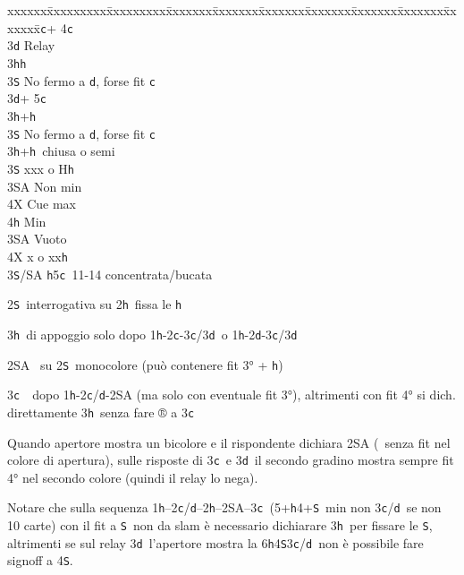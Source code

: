 \documentclass[a4paper,italian]{article}
\newcommand{\BS}{\small{\texttt{S}}}
\newcommand{\BC}{\small{\texttt{c}}}
\newcommand{\BD}{\small{\texttt{d}}}
\newcommand{\BH}{\small{\texttt{h}}}
\newenvironment{bidtable}
{\begin{tabbing}

    xxxxxx\=xxxxxxxxx\=xxxxxxxxx\=xxxxxxx\=xxxxxxx\=xxxxxxx\=xxxxxxx\=xxxxxxx\=xxxxxxx\=xxxxxxx\=\kill}
{\end{tabbing} }%
\newenvironment{varie}[1]
{\begin{tcolorbox}[colframe=green!40!black,title=#1]}
    {
\end{tcolorbox} }%
\begin{document}
\begin{multicols}{2}
\begin{bidtable}
        3\BC {}+ 4\BC \+\\
        3\BD \> Relay\\
        3\BH {}\BH \\
        3\BS \> No fermo a \BD , forse fit \BC \-\\
        3\BD {}+ 5\BC \+\\
        3\BH {}+\BH \\
        3\BS \> No fermo a \BD , forse fit \BC \-\\
        3\BH {}+\BH\ chiusa o semi\+\\
        3\BS \> xxx o H\BH \+\\
        3\small{SA} \> Non min\\
        4X \> Cue max\\
        4\BH \> Min\-\\
        3\small{SA} \> Vuoto\\
        4X \> x o xx\BH \-\\
        3\BS/\small{SA} \BH 5\BC\ 11-14 concentrata/bucata
    \end{bidtable}
\end{multicols}

\begin{varie}{Riepilogo mnemonico per i fissaggi}
    2\BS\ interrogativa su 2\BH\ fissa le \BH

    3\BH\ di appoggio solo dopo 1\BH-2\BC-3\BC/3\BD\ o 1\BH-2\BD-3\BC/3\BD

    2\small{SA} \textregistered\ su 2\BS\ monocolore  (può contenere fit 3° + \BH )

    3\BC\ \textregistered\ dopo 1\BH-2\BC/\BD-2\small{SA} (ma solo con eventuale fit 3°), altrimenti con fit 4° si dich.
    direttamente 3\BH\ senza fare ® a 3\BC

    Quando apertore mostra un bicolore e il rispondente dichiara 2\small{SA}
    (\textregistered\ senza fit nel colore di apertura), sulle risposte di
    3\BC\ e 3\BD\ il secondo gradino mostra sempre fit 4° nel secondo colore
    (quindi il relay lo nega).

    Notare che sulla sequenza 1\BH--2\BC/\BD--2\BH--2\small{SA}--3\BC\ (5+\BH4+\BS\ min
    non 3\BC/\BD\ se non 10 carte) con il fit a \BS\ non da slam è necessario
    dichiarare 3\BH\ per fissare le \BS, altrimenti se sul relay 3\BD\
    l'apertore mostra la 6\BH4\BS3\BC/\BD\ non è possibile fare signoff a 4\BS.

\end{varie}
\newpage
\end{document}
